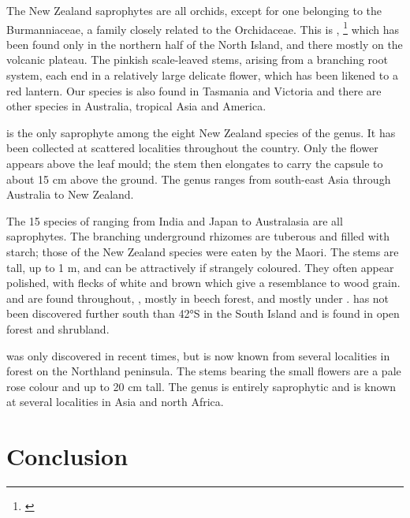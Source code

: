 The New Zealand saprophytes are all orchids, except for one belonging to the Burmanniaceae, a family closely related to the Orchidaceae.
This is , \footnote{\cite{campbell1968investigation}} which has been found only in the northern half of the North Island, and there mostly on the volcanic plateau.
The pinkish scale-leaved stems, arising from a branching root system, each end in a relatively large delicate flower, which has been likened to a red lantern.
Our species is also found in Tasmania and Victoria and there are other species in Australia, tropical Asia and America.

 is the only saprophyte among the eight New Zealand species of the genus.
It has been collected at scattered localities throughout the country.
Only the flower appears above the leaf mould; the stem then elongates to carry the capsule to about 15 cm above the ground.
The genus ranges from south-east Asia through Australia to New Zealand.

The 15 species of  ranging from India and Japan to Australasia are all saprophytes.
The branching underground rhizomes are tuberous and filled with starch; those of the New Zealand species were eaten by the Maori.
The stems are tall, up to 1 m, and can be attractively if strangely coloured.
They often appear polished, with flecks of white and brown which give a resemblance to wood grain.  and  are found throughout, , mostly in beech forest, and  mostly under .  has not been discovered further south than 42°S in the South Island and is found in open forest and shrubland.

 was only discovered in recent times, but is now known from several localities in  forest on the Northland peninsula.
The stems bearing the small flowers are a pale rose colour and up to 20 cm tall.
The genus is entirely saprophytic and is known at several localities in Asia and north Africa.

\section{Conclusion}

